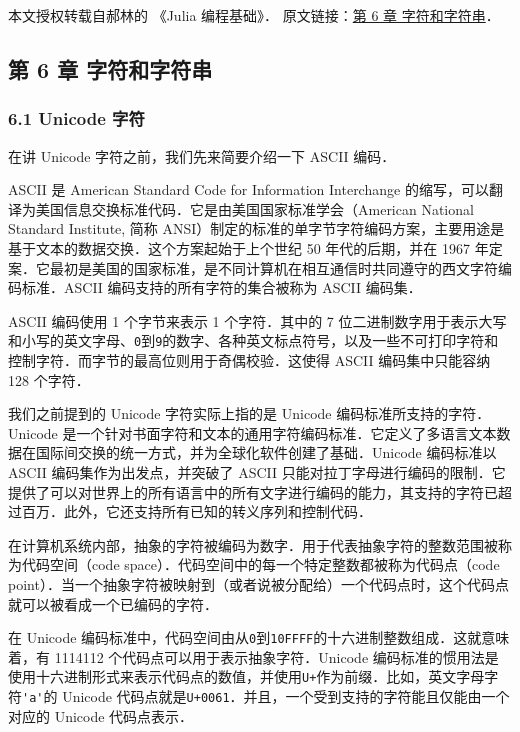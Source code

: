 
本文授权转载自郝林的 《Julia 编程基础》． 原文链接：\href{https://github.com/hyper0x/JuliaBasics/blob/master/book/ch06.md}{第 6 章 字符和字符串}．


\subsection{第 6 章 字符和字符串}

\subsubsection{6.1 Unicode 字符}

在讲 Unicode 字符之前，我们先来简要介绍一下 ASCII 编码．

ASCII 是 American Standard Code for Information Interchange 的缩写，可以翻译为美国信息交换标准代码．它是由美国国家标准学会（American National Standard Institute, 简称 ANSI）制定的标准的单字节字符编码方案，主要用途是基于文本的数据交换．这个方案起始于上个世纪 50 年代的后期，并在 1967 年定案．它最初是美国的国家标准，是不同计算机在相互通信时共同遵守的西文字符编码标准．ASCII 编码支持的所有字符的集合被称为 ASCII 编码集．

ASCII 编码使用 1 个字节来表示 1 个字符．其中的 7 位二进制数字用于表示大写和小写的英文字母、\verb|0|到\verb|9|的数字、各种英文标点符号，以及一些不可打印字符和控制字符．而字节的最高位则用于奇偶校验．这使得 ASCII 编码集中只能容纳 128 个字符．

我们之前提到的 Unicode 字符实际上指的是 Unicode 编码标准所支持的字符．Unicode 是一个针对书面字符和文本的通用字符编码标准．它定义了多语言文本数据在国际间交换的统一方式，并为全球化软件创建了基础．Unicode 编码标准以 ASCII 编码集作为出发点，并突破了 ASCII 只能对拉丁字母进行编码的限制．它提供了可以对世界上的所有语言中的所有文字进行编码的能力，其支持的字符已超过百万．此外，它还支持所有已知的转义序列和控制代码．

在计算机系统内部，抽象的字符被编码为数字．用于代表抽象字符的整数范围被称为代码空间（code space）．代码空间中的每一个特定整数都被称为代码点（code point）．当一个抽象字符被映射到（或者说被分配给）一个代码点时，这个代码点就可以被看成一个已编码的字符．

在 Unicode 编码标准中，代码空间由从\verb|0|到\verb|10FFFF|的十六进制整数组成．这就意味着，有 1114112 个代码点可以用于表示抽象字符．Unicode 编码标准的惯用法是使用十六进制形式来表示代码点的数值，并使用\verb|U+|作为前缀．比如，英文字母字符\verb|'a'|的 Unicode 代码点就是\verb|U+0061|．并且，一个受到支持的字符能且仅能由一个对应的 Unicode 代码点表示．

